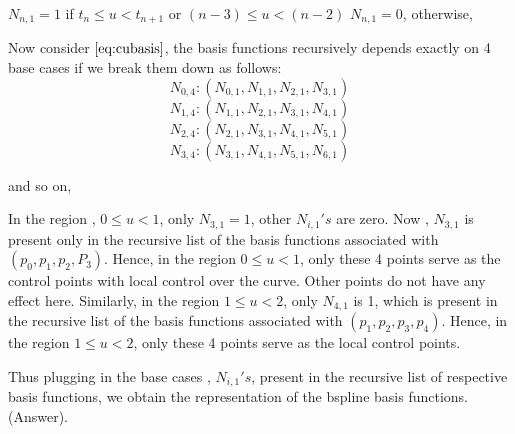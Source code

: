\documentclass{article}
\begin{document}
$N_{n,1} = 1$ if $t_n \leq u < t_{n+1}$ or $(n-3) \leq u < (n-2)$ \newline
$N_{n,1} = 0$, otherwise, \newline \newline

Now consider $\eqref{eq:cubasis}$, the basis functions recursively depends exactly on 4 base cases if we break them down as follows: \newline
\[ N_{0,4} : (N_{0,1}, N_{1,1}, N_{2,1}, N_{3,1})\]
\[ N_{1,4} : ( N_{1,1}, N_{2,1}, N_{3,1}, N_{4,1})\]
\[ N_{2,4} : ( N_{2,1}, N_{3,1}, N_{4,1}, N_{5,1})\]
\[ N_{3,4} : ( N_{3,1}, N_{4,1}, N_{5,1}, N_{6,1})\]

and so on, \newline

In the region , $0 \leq u < 1$, only $N_{3,1}=1$, other $N_{i,1}'s$ are zero. Now , $N_{3,1}$ is present only in the recursive list of the basis functions associated with  $(p_0, p_1, p_2, P_3)$. Hence, in the region $0 \leq u < 1$, only these 4 points serve as the control points with local control over the curve. Other points do not have any effect here. Similarly, in the region $1 \leq u < 2$, only $N_{4,1}$ is 1, which is present in the recursive list of the basis functions associated with $(p_1, p_2, p_3,p_4)$. Hence, in the region $1 \leq u < 2$, only these 4 points serve as the local control points. \newline

Thus plugging in the base cases , $N_{i,1}'s$, present in the recursive list of respective basis functions, we obtain the representation of the bspline basis functions. (Answer). \newline
\end{document}
